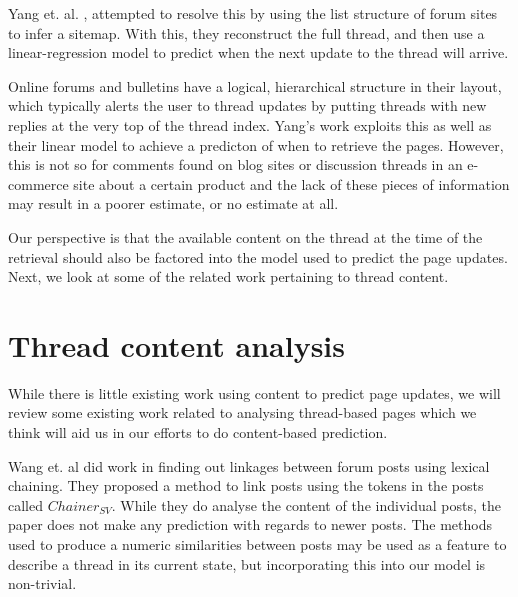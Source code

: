 Yang et. al. \cite{Yang2009}, attempted to resolve this by using the list 
structure of forum sites to infer a sitemap. With this, they reconstruct the 
full thread, and then use a linear-regression model to predict when the next 
update to the thread will arrive. %

Online forums and bulletins have a logical, hierarchical structure in their 
layout, which typically alerts the user to thread updates by putting threads 
with new replies at the very top of the thread index. Yang's work exploits this 
as well as their linear model to achieve a predicton of when to retrieve the 
pages.
However, this is not so for comments found on blog sites or discussion threads 
in an e-commerce site about a certain product and the lack of these pieces of 
information may result in a poorer estimate, or no estimate at all.


Our perspective is that the available content on the thread at the time of the 
retrieval should also be factored into the model used to predict the page 
updates. Next, we look at some of the related work pertaining to thread content.

\section{Thread content analysis}
While there is little existing work using content to predict page updates, we 
will review some existing work related to analysing thread-based pages which we 
think will aid us in our efforts to do content-based prediction.

Wang et. al \cite{Wang2011} did work in finding out linkages between forum posts 
using lexical chaining. They proposed a method to link posts using the tokens in 
the posts called $Chainer_{SV}$. While they do analyse the content of the 
individual posts, the paper does not make any prediction with regards to newer 
posts. The methods used to produce a numeric similarities between posts may be 
used as a feature to describe a thread in its current state, but incorporating 
this into our model is non-trivial.



